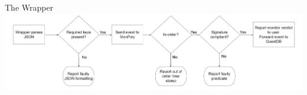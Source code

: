 \begin{frame}{The Wrapper}
    \includegraphics[width=1.0\linewidth]{diagrams/flowchart-2.png}
\end{frame}